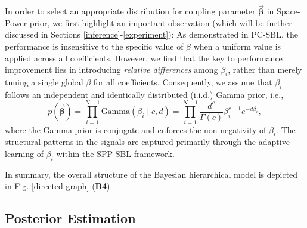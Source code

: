 \documentclass[lettersize,journal]{IEEEtran}
\theoremstyle{remark}
\begin{document}
In order to select an appropriate distribution for coupling parameter $\vec{\boldsymbol{\beta}}$ in Space-Power prior, we first highlight an important observation (which will be further discussed in {Sections \ref{inference}-\ref{experiment}}): As demonstrated in PC-SBL, the performance is insensitive to the specific value of \( \beta \) when a uniform value is applied across all coefficients. However, we find that the key to performance improvement lies in introducing \textit{relative differences} among \( \beta_i \), rather than merely tuning a single global \( \beta \) for all coefficients. Consequently, we assume that \( \beta_i \) follows an independent and identically distributed (i.i.d.) Gamma prior, i.e.,  
\begin{equation}
	p(\vec{\boldsymbol{\beta}})=\prod_{i=1}^{N-1}\text{Gamma}\left(\beta_i \mid c, d\right)= \prod_{i=1}^{N-1}\frac{d^c}{\Gamma(c)}\beta_i^{c-1} e^{-d\beta_i},\label{prior_beta}
\end{equation}
where the Gamma prior is conjugate and enforces the non-negativity of $\beta_i$. The structural patterns in the signals are captured primarily through the adaptive learning of $\beta_i$ within the SPP-SBL framework.


In summary, the overall structure of the Bayesian
hierarchical model is depicted in Fig. \ref{directed graph} (\textbf{B4}).

\subsection{Posterior Estimation}
\end{document}
